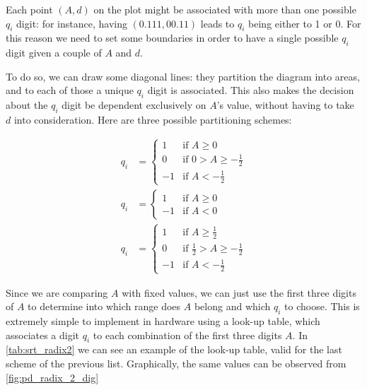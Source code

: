 Each point $(A, d)$ on the plot might be associated with more than one possible $q_i$ digit: for instance, having $(0.111, 00.11)$ leads to $q_i$ being either to 1 or 0.
For this reason we need to set some boundaries in order to have a single possible $q_i$ digit given a couple of $A$ and $d$.

To do so, we can draw some diagonal lines: they partition the diagram into areas, and to each of those a unique $q_i$ digit is associated. 
This also makes the decision about the $q_i$ digit be dependent exclusively on $A$'s value, without having to take $d$ into consideration.
Here are three possible partitioning schemes:

\begin{align*}
    q_i &=
    \begin{cases}
      1 & \text{if $A \ge 0$}\\
      0 & \text{if $0 > A \ge -\frac{1}{2}$}\\
      -1 & \text{if $A < -\frac{1}{2}$}
      \end{cases}
      \\ 
    q_i &=
    \begin{cases}
      1 & \text{if $A \ge 0$}\\
      -1 & \text{if $A < 0$}
    \end{cases}
    \\ 
    q_i &=
    \begin{cases}
      1 & \text{if $A \ge \frac{1}{2}$}\\
      0 & \text{if $\frac{1}{2} > A \ge -\frac{1}{2}$}\\
      -1 & \text{if $A < -\frac{1}{2}$}
    \end{cases}
\end{align*}

Since we are comparing $A$ with fixed values, we can just use the first three digits of $A$ to determine into which range does $A$ belong and which $q_i$ to choose.
This is extremely simple to implement in hardware using a look-up table, which associates a digit $q_i$ to each combination of the first three digits $A$.
In \autoref{tab:srt_radix2} we can see an example of the look-up table, valid for the last scheme of the previous list. Graphically, the same values can be observed from \autoref{fig:pd_radix_2_dig}

